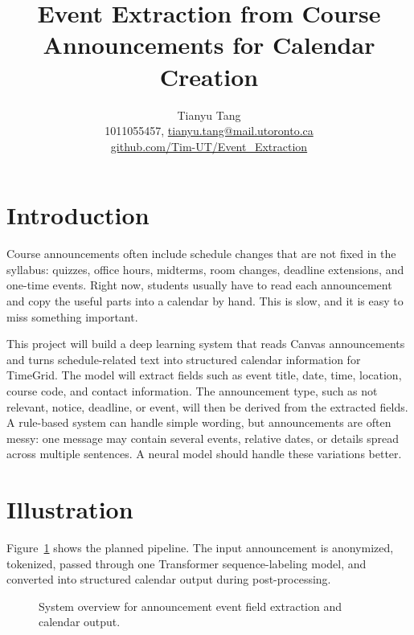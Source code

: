 \documentclass[final]{article}
\title{Event Extraction from Course Announcements for Calendar Creation}
\author{%
  Tianyu Tang \\
  1011055457, \href{mailto:tianyu.tang@mail.utoronto.ca}{tianyu.tang@mail.utoronto.ca}\\
  \href{https://github.com/Tim-UT/Event_Extraction}{github.com/Tim-UT/Event\_Extraction}\\
}
\begin{document}
\maketitle
\vspace{-0.55in}

\section*{Introduction}
Course announcements often include schedule changes that are not fixed in the syllabus: quizzes, office hours, midterms, room changes, deadline extensions, and one-time events. Right now, students usually have to read each announcement and copy the useful parts into a calendar by hand. This is slow, and it is easy to miss something important.

This project will build a deep learning system that reads Canvas announcements and turns schedule-related text into structured calendar information for TimeGrid. The model will extract fields such as event title, date, time, location, course code, and contact information. The announcement type, such as not relevant, notice, deadline, or event, will then be derived from the extracted fields. A rule-based system can handle simple wording, but announcements are often messy: one message may contain several events, relative dates, or details spread across multiple sentences. A neural model should handle these variations better.

\section*{Illustration}
Figure~\ref{fig:system} shows the planned pipeline. The input announcement is anonymized, tokenized, passed through one Transformer sequence-labeling model, and converted into structured calendar output during post-processing.

\begin{figure}[!h]
  \centering
  \caption{System overview for announcement event field extraction and calendar output.}
  \label{fig:system}
\end{figure}
\end{document}

